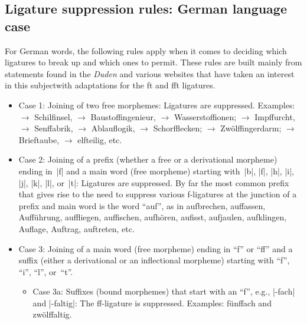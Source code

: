 \documentclass[11pt]{article}
\begin{document}
\subsection[selnolig's ligature suppression rules: German language case]{Ligature suppression rules: German language case} \label{sec:german-rules}

For German words, the following rules apply when it comes to deciding which ligatures to break up and which ones to permit. These rules are built mainly from statements found in the \emph{Duden} and various websites that have taken an interest in this subject\textemdash with adaptations for the ft and fft ligatures.
\begin{itemize}
\item Case 1: Joining of two free morphemes: Ligatures are suppressed. Examples: 
 $\to$ Schilfinsel, 
 $\to$ Baustoffingenieur,
 $\to$ Wasserstoffionen; 
 $\to$ Impffurcht, 
 $\to$ Senffabrik, 
 $\to$ Ablauflogik,  
 $\to$ Schorfflecken; 
 $\to$ Zwölffingerdarm; 
 $\to$ Brieftaube, 
 $\to$ elfteilig, 
etc.

\item Case 2: Joining of a prefix (whether a free or a derivational morpheme) ending in~|f| and a main word (free morpheme) starting with~|b|, |f|, |h|, |i|, |j|, |k|, |l|, or~|t|: Ligatures are suppressed. By far the most common prefix that gives rise to the need to suppress various f-ligatures at the junction of a prefix and main word is the word \enquote{auf}, as in aufbrechen, auffassen, Aufführung, auffliegen, auffischen, aufhören, aufisst, aufjaulen, aufklingen, Auflage, Auftrag, auftreten, etc.

\item Case 3: Joining of a main word (free morpheme) ending in \enquote{f} or \enquote{ff} and a suffix (either a derivational or an inflectional morpheme) starting with \enquote{f}, \enquote{i}, \enquote{l}, or~\enquote{t}.

\begin{itemize}
\item Case 3a: Suffixes (bound morphemes) that start with an \enquote{f}, e.g., |-fach| and |-faltig|: The ff-ligature is suppressed. Examples: fünffach and zwölffaltig. 


\end{itemize}
\end{itemize}
\end{document}

